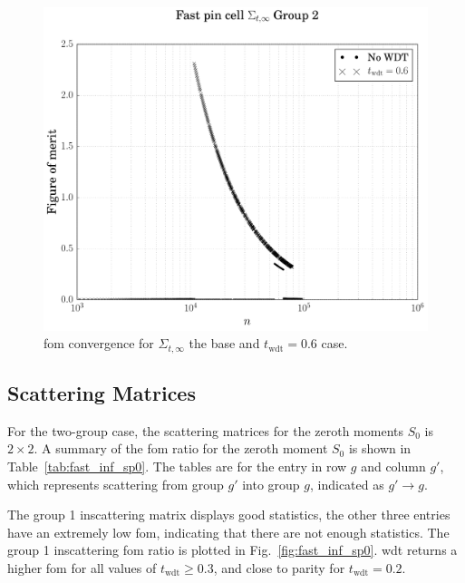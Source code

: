 \begin{figure}[hbtp]
  \centering
  \includegraphics[scale=0.5]{images/results/fast_inf_tot_example}
  \caption[\Acrshort{fom} convergence for $\Sigma_{t,\infty}$ the base
  and $t_{\mathrm{wdt}} = 0.6$ case.]{\Acrshort{fom} convergence for
    $\Sigma_{t,\infty}$ the base and $t_{\mathrm{wdt}} = 0.6$ case.}
  \label{fig:fast_inf_tot_example}
\end{figure}

\subsection{Scattering Matrices}
\label{sec:fast_inf_sp0}

For the two-group case, the scattering matrices for the zeroth
moments $S_0$ is $2 \times 2$. A summary of the \gls{fom} ratio
for the zeroth moment $S_0$ is shown in Table~\ref{tab:fast_inf_sp0}. The
tables are for the entry in row $g$ and column $g'$, which represents
scattering from group $g'$ into group $g$, indicated as $g' \to g$.

The group 1 inscattering matrix displays good statistics, the other
three entries have an extremely low \gls{fom}, indicating that there
are not enough statistics. The group 1 inscattering \gls{fom} ratio is
plotted in Fig.~\ref{fig:fast_inf_sp0}. \gls{wdt} returns a higher
\gls{fom} for all values of $t_{\mathrm{wdt}} \geq 0.3$, and close to
parity for $t_{\mathrm{wdt}} = 0.2$.

